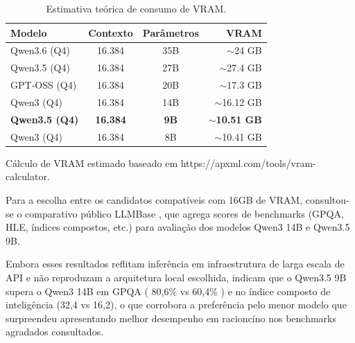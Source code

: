 \documentclass[12pt]{article}
\begin{document}
\begin{table}[H]
  \centering
  \begin{threeparttable}
  \caption{Estimativa teórica de consumo de VRAM.}
  \label{tab:latency_compatibility}
  \footnotesize
  \begin{tabular}{l c c r}
    \toprule
    \textbf{Modelo}       & \textbf{Contexto} & \textbf{Parâmetros} & \textbf{VRAM}           \\
    \midrule
    Qwen3.6 (Q4)          & 16.384            & 35B                 & $\sim$24 GB             \\
    Qwen3.5 (Q4)          & 16.384            & 27B                 & $\sim$27.4 GB           \\
    GPT-OSS (Q4)          & 16.384            & 20B                 & $\sim$17.3 GB           \\
    Qwen3 (Q4)            & 16.384            & 14B                 & $\sim$16.12 GB          \\
    \textbf{Qwen3.5 (Q4)} & \textbf{16.384}   & \textbf{9B}         & \textbf{$\sim$10.51 GB} \\
    Qwen3 (Q4)            & 16.384            & 8B                  & $\sim$10.41 GB          \\
    \bottomrule
  \end{tabular}
  \begin{tablenotes}
    \footnotesize
    \item[*] Cálculo de VRAM estimado baseado em https://apxml.com/tools/vram-calculator.
  \end{tablenotes}
  \end{threeparttable}
\end{table}

Para a escolha entre os candidatos compatíveis com 16GB de VRAM, consultou-se o comparativo público LLMBase \cite{benchmarks_llm}, que agrega scores de benchmarks (GPQA, HLE, índices compostos, etc.) para avaliação dos modelos Qwen3 14B e Qwen3.5 9B.

Embora esses resultados reflitam inferência em infraestrutura de larga escala de API e não reproduzam a arquitetura local escolhida, indicam que o Qwen3.5 9B supera o Qwen3 14B em GPQA ( 80,6\% vs 60,4\% ) e no índice composto de inteligência (32,4 vs 16,2), o que corrobora a preferência pelo menor modelo que surpreendeu apresentando melhor desempenho em racioncíno nos benchmarks agradados consultados.
\end{document}
